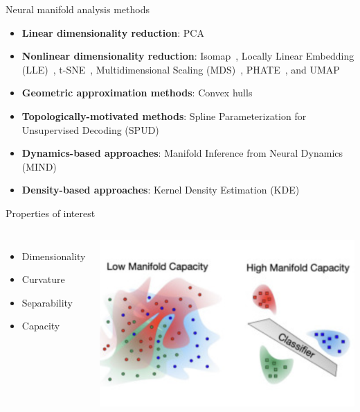 \documentclass[aspectratio=169]{beamer}
\begin{document}
\begin{frame}{Neural manifold analysis methods}
    \begin{itemize}
        \item \textbf{Linear dimensionality reduction}: PCA
        
        \item \textbf{Nonlinear dimensionality reduction}: Isomap~\cite{tenenbaum2000global}, Locally Linear Embedding (LLE)~\cite{roweis2000nonlinear}, t-SNE~\cite{vandermaaten2008visualizing}, Multidimensional Scaling (MDS)~\cite{kruskal1964multidimensional}, PHATE~\cite{moon2019visualizing}, and UMAP~\cite{mcinnes2018umap}
        
        \item \textbf{Geometric approximation methods}: Convex hulls
        
        \item \textbf{Topologically-motivated methods}: Spline Parameterization for Unsupervised Decoding (SPUD)~\cite{chaudhuri2019intrinsic} 
        
        \item \textbf{Dynamics-based approaches}: Manifold Inference from Neural Dynamics (MIND)~\cite{low2018probing}
        
        
        \item \textbf{Density-based approaches}: Kernel Density Estimation (KDE)
    \end{itemize}
\end{frame}

\begin{frame}{Properties of interest}
    \begin{columns}
        \begin{itemize}
            \item Dimensionality
            \item Curvature
            \item Separability
            \item Capacity
        \end{itemize}
        \begin{center}
            \includegraphics[width=\textwidth]{figs/capacity.png}
            \cite{chung2021neural}
        \end{center}
    \end{columns}
\end{frame}
\end{document}
